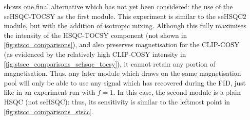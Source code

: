  shows one final alternative which has not yet been considered: the use of the seHSQC-TOCSY\autocite{Hansen2021AC} as the first module.
This experiment is similar to the seHSQC2 module, but with the addition of isotropic mixing.
Although this fully maximises the intensity of the HSQC-TOCSY component (not shown in \cref{fig:stscc_comparisons}), and also preserves  magnetisation for the CLIP-COSY (as evidenced by the relatively high CLIP-COSY intensity in \cref{fig:stscc_comparisons_sehsqc_tocsy}), it cannot retain any portion of  magnetisation.
Thus, any later \carbon{} module which draws on the same magnetisation pool will only be able to use any signal which has recovered during the FID, just like in an experiment run with $f = 1$.
In this case, the second module is a plain HSQC (not seHSQC): thus, its sensitivity is similar to the leftmost point in \cref{fig:stscc_comparisons_stscc}.

